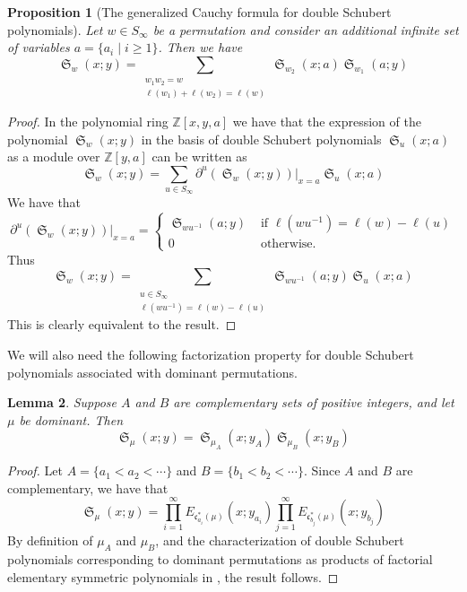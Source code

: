 \documentclass[reqno]{amsart}
\newtheorem{lemma}{Lemma}[subsection]
\newtheorem{proposition}[lemma]{Proposition}
\theoremstyle{definition}
\theoremstyle{remark}
\numberwithin{equation}{subsection}
\DeclareMathOperator{\sch}{\mathfrak{S}}
\newcommand{\code}{\mathfrak{c}}
\begin{document}
\begin{proposition}[The generalized Cauchy formula for double Schubert polynomials]
Let $w\in S_\infty$ be a permutation and consider an additional infinite set of variables $a=\{a_i\mid i\geq 1\}$. Then we have
$$\sch_w(x;y)=\sum_{\substack{w_1w_2=w\\\ell(w_1)+\ell(w_2)=\ell(w)}}\sch_{w_2}(x;a)\sch_{w_1}(a;y)$$
\end{proposition}
\begin{proof}
In the polynomial ring $\mathbb{Z}[x,y,a]$ we have that the expression of the polynomial $\sch_w(x;y)$ in the basis of double Schubert polynomials $\sch_u(x;a)$ as a module over $\mathbb{Z}[y,a]$ can be written as
$$\sch_w(x;y)=\sum_{u\in S_\infty}\partial^u(\sch_w(x;y))|_{x=a}\sch_u(x;a)$$
We have that 
$$\partial^u(\sch_w(x;y))|_{x=a}=\begin{cases}
\sch_{wu^{-1}}(a;y)&\mbox{ if }\ell(wu^{-1})=\ell(w)-\ell(u)\\
0&\mbox{ otherwise.}
\end{cases}$$
Thus
$$\sch_w(x;y)=\sum_{\substack{u\in S_\infty\\\ell(wu^{-1})=\ell(w)-\ell(u)}}\sch_{wu^{-1}}(a;y)\sch_u(x;a)$$
This is clearly equivalent to the result.
\end{proof}

We will also need the following factorization property for double Schubert polynomials associated with dominant permutations.

\begin{lemma} \label{lemma:domprod}
Suppose $A$ and $B$ are complementary sets of positive integers, and let $\mu$ be dominant. Then
$$\sch_\mu(x;y)=\sch_{\mu_A}(x;y_A)\sch_{\mu_B}(x;y_B)$$
\end{lemma}
\begin{proof}
Let $A=\{a_1<a_2<\cdots\}$ and $B=\{b_1<b_2<\cdots\}$. Since $A$ and $B$ are complementary, we have that
$$\sch_{\mu}(x;y)=\prod_{i=1}^\infty E_{\code^*_{a_i}(\mu)}(x;y_{a_i})\prod_{j=1}^\infty E_{\code^*_{b_j}(\mu)}(x;y_{b_j})$$
By definition of $\mu_A$ and $\mu_B$, and the characterization of double Schubert polynomials corresponding to dominant permutations as products of factorial elementary symmetric polynomials in \cite[Lemma~4.5]{samuelmolev}, the result follows.
\end{proof}
\end{document}
